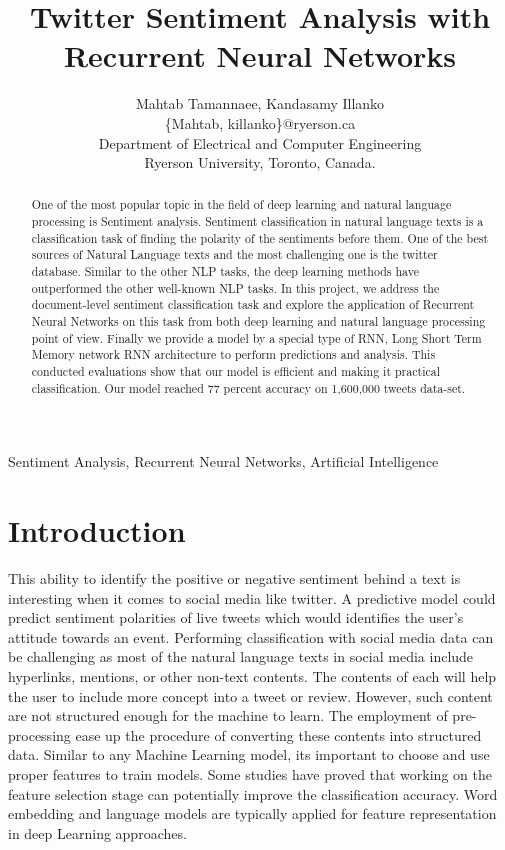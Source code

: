 \documentclass[journal]{IEEEtran}
\begin{document}
\title{Twitter Sentiment Analysis with Recurrent Neural
Networks}

\author{Mahtab Tamannaee, Kandasamy Illanko\\
\{Mahtab, killanko\}@ryerson.ca\\
Department of Electrical and Computer Engineering\\
Ryerson University, Toronto, Canada.}
\maketitle
\begin{abstract}
One of the most popular topic in the field of deep learning and natural language processing is Sentiment analysis. Sentiment classification in natural language texts is a classification task of finding the polarity of the sentiments before them. One of the best sources of Natural Language texts and the most challenging one is the twitter database. Similar to the other NLP tasks, the deep learning methods have outperformed the other well-known NLP tasks.
In this project, we address the document-level sentiment classification task and explore the application of Recurrent Neural Networks on this task from both deep learning and natural language processing point of view. Finally we provide a model by a special type of RNN, Long Short Term Memory network RNN architecture to perform predictions and analysis. This conducted evaluations show that our model is efficient and making it practical classification. Our model reached 77 percent accuracy on 1,600,000 tweets data-set.

\end{abstract}
\begin{IEEEkeywords}
Sentiment Analysis, Recurrent Neural Networks, Artificial Intelligence
\end{IEEEkeywords}

\section{Introduction}
\label{intro}

This ability to identify the positive or negative sentiment behind a text is interesting when it comes to social media like twitter. A predictive model could predict sentiment polarities of live tweets which would identifies the user's attitude  towards an event. Performing classification with social media data can be challenging as most of the natural language texts in social media include hyperlinks, mentions, or other non-text contents. The contents of each will help the user to include more concept into a tweet or review. However, such content are not structured enough for the machine to learn. The employment of pre-processing ease up the procedure of converting these contents into structured data\cite{Mabrouk}. Similar to any Machine Learning model, its important to choose and use proper features to train models. Some studies have proved that working on the feature selection stage can potentially improve the classification accuracy. Word embedding and language models are typically applied for feature representation in deep Learning approaches.\cite{Mabrouk}
\end{document}
